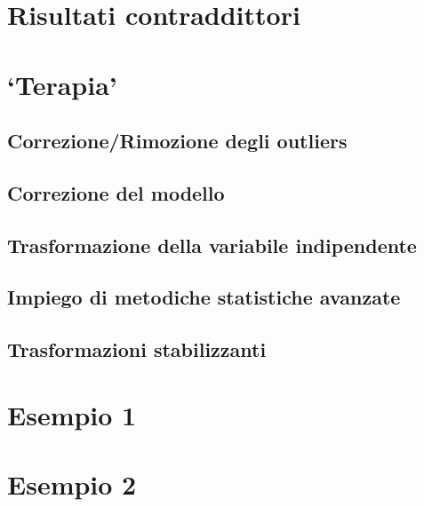 \documentclass[a4paper,12pt,oneside]{book}
\begin{document}
\hypertarget{risultati-contraddittori}{%
\section{Risultati contraddittori}\label{risultati-contraddittori}}

\hypertarget{terapia}{%
\section{`Terapia'}\label{terapia}}

\hypertarget{correzionerimozione-degli-outliers}{%
\subsection{Correzione/Rimozione degli outliers}\label{correzionerimozione-degli-outliers}}

\hypertarget{correzione-del-modello}{%
\subsection{Correzione del modello}\label{correzione-del-modello}}

\hypertarget{trasformazione-della-variabile-indipendente}{%
\subsection{Trasformazione della variabile indipendente}\label{trasformazione-della-variabile-indipendente}}

\hypertarget{impiego-di-metodiche-statistiche-avanzate}{%
\subsection{Impiego di metodiche statistiche avanzate}\label{impiego-di-metodiche-statistiche-avanzate}}

\hypertarget{trasformazioni-stabilizzanti}{%
\subsection{Trasformazioni stabilizzanti}\label{trasformazioni-stabilizzanti}}

\hypertarget{esempio-1}{%
\section{Esempio 1}\label{esempio-1}}

\hypertarget{esempio-2}{%
\section{Esempio 2}\label{esempio-2}}
\end{document}
